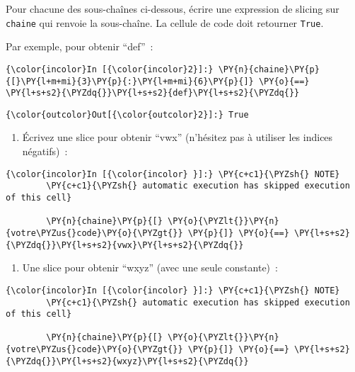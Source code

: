     Pour chacune des sous-chaînes ci-dessous, écrire une expression de
slicing sur \texttt{chaine} qui renvoie la sous-chaîne. La cellule de
code doit retourner \texttt{True}.

    Par exemple, pour obtenir ``def''~:

    \begin{Verbatim}[commandchars=\\\{\}]
{\color{incolor}In [{\color{incolor}2}]:} \PY{n}{chaine}\PY{p}{[}\PY{l+m+mi}{3}\PY{p}{:}\PY{l+m+mi}{6}\PY{p}{]} \PY{o}{==} \PY{l+s+s2}{\PYZdq{}}\PY{l+s+s2}{def}\PY{l+s+s2}{\PYZdq{}}
\end{Verbatim}


\begin{Verbatim}[commandchars=\\\{\}]
{\color{outcolor}Out[{\color{outcolor}2}]:} True
\end{Verbatim}
            
    \begin{enumerate}
\def\labelenumi{\arabic{enumi})}
\tightlist
\item
  Écrivez une slice pour obtenir ``vwx'' (n'hésitez pas à utiliser les
  indices négatifs)~:
\end{enumerate}

    \begin{Verbatim}[commandchars=\\\{\}]
{\color{incolor}In [{\color{incolor} }]:} \PY{c+c1}{\PYZsh{} NOTE}
        \PY{c+c1}{\PYZsh{} automatic execution has skipped execution of this cell}
        
        \PY{n}{chaine}\PY{p}{[} \PY{o}{\PYZlt{}}\PY{n}{votre\PYZus{}code}\PY{o}{\PYZgt{}} \PY{p}{]} \PY{o}{==} \PY{l+s+s2}{\PYZdq{}}\PY{l+s+s2}{vwx}\PY{l+s+s2}{\PYZdq{}}
\end{Verbatim}


    \begin{enumerate}
\def\labelenumi{\arabic{enumi})}
\setcounter{enumi}{1}
\tightlist
\item
  Une slice pour obtenir ``wxyz'' (avec une seule constante)~:
\end{enumerate}

    \begin{Verbatim}[commandchars=\\\{\}]
{\color{incolor}In [{\color{incolor} }]:} \PY{c+c1}{\PYZsh{} NOTE}
        \PY{c+c1}{\PYZsh{} automatic execution has skipped execution of this cell}
        
        \PY{n}{chaine}\PY{p}{[} \PY{o}{\PYZlt{}}\PY{n}{votre\PYZus{}code}\PY{o}{\PYZgt{}} \PY{p}{]} \PY{o}{==} \PY{l+s+s2}{\PYZdq{}}\PY{l+s+s2}{wxyz}\PY{l+s+s2}{\PYZdq{}}
\end{Verbatim}


